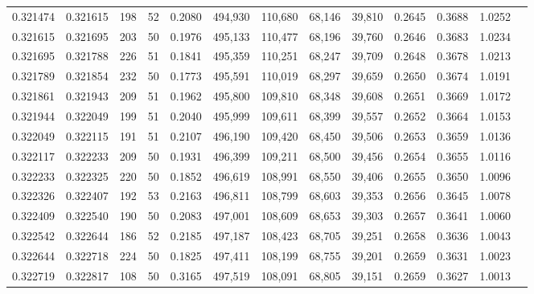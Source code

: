 \begin{tabular}{rrrrrrrrrrrrr}
0.321474 & 0.321615 &   198 &  52 &                                     0.2080 & 494,930 & 110,680 &  68,146 &  39,810 & 0.2645 & 0.3688 & 1.0252 \\
0.321615 & 0.321695 &   203 &  50 &                                     0.1976 & 495,133 & 110,477 &  68,196 &  39,760 & 0.2646 & 0.3683 & 1.0234 \\
0.321695 & 0.321788 &   226 &  51 &                                     0.1841 & 495,359 & 110,251 &  68,247 &  39,709 & 0.2648 & 0.3678 & 1.0213 \\
0.321789 & 0.321854 &   232 &  50 &                                     0.1773 & 495,591 & 110,019 &  68,297 &  39,659 & 0.2650 & 0.3674 & 1.0191 \\
0.321861 & 0.321943 &   209 &  51 &                                     0.1962 & 495,800 & 109,810 &  68,348 &  39,608 & 0.2651 & 0.3669 & 1.0172 \\
0.321944 & 0.322049 &   199 &  51 &                                     0.2040 & 495,999 & 109,611 &  68,399 &  39,557 & 0.2652 & 0.3664 & 1.0153 \\
0.322049 & 0.322115 &   191 &  51 &                                     0.2107 & 496,190 & 109,420 &  68,450 &  39,506 & 0.2653 & 0.3659 & 1.0136 \\
0.322117 & 0.322233 &   209 &  50 &                                     0.1931 & 496,399 & 109,211 &  68,500 &  39,456 & 0.2654 & 0.3655 & 1.0116 \\
0.322233 & 0.322325 &   220 &  50 &                                     0.1852 & 496,619 & 108,991 &  68,550 &  39,406 & 0.2655 & 0.3650 & 1.0096 \\
0.322326 & 0.322407 &   192 &  53 &                                     0.2163 & 496,811 & 108,799 &  68,603 &  39,353 & 0.2656 & 0.3645 & 1.0078 \\
0.322409 & 0.322540 &   190 &  50 &                                     0.2083 & 497,001 & 108,609 &  68,653 &  39,303 & 0.2657 & 0.3641 & 1.0060 \\
0.322542 & 0.322644 &   186 &  52 &                                     0.2185 & 497,187 & 108,423 &  68,705 &  39,251 & 0.2658 & 0.3636 & 1.0043 \\
0.322644 & 0.322718 &   224 &  50 &                                     0.1825 & 497,411 & 108,199 &  68,755 &  39,201 & 0.2659 & 0.3631 & 1.0023 \\
0.322719 & 0.322817 &   108 &  50 &                                     0.3165 & 497,519 & 108,091 &  68,805 &  39,151 & 0.2659 & 0.3627 & 1.0013 \\

\end{tabular}
